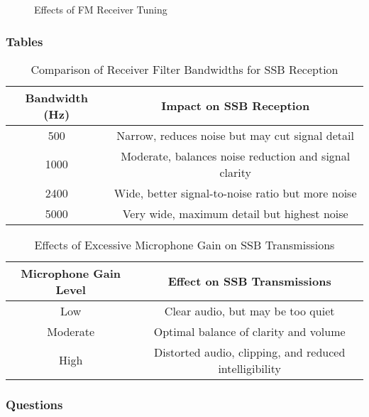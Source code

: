 \begin{figure}[h]
    \centering
    \caption{Effects of FM Receiver Tuning}
    \label{fig:fm-tuning}
\end{figure}

\subsubsection*{Tables}

\begin{table}[h]
    \centering
    \caption{Comparison of Receiver Filter Bandwidths for SSB Reception}
    \label{tab:filter-bandwidth-comparison}
    \begin{tabular}{|c|c|}
        \hline
        \textbf{Bandwidth (Hz)} & \textbf{Impact on SSB Reception} \\
        \hline
        500 & Narrow, reduces noise but may cut signal detail \\
        1000 & Moderate, balances noise reduction and signal clarity \\
        2400 & Wide, better signal-to-noise ratio but more noise \\
        5000 & Very wide, maximum detail but highest noise \\
        \hline
    \end{tabular}
\end{table}

\begin{table}[h]
    \centering
    \caption{Effects of Excessive Microphone Gain on SSB Transmissions}
    \label{tab:mic-gain-effects}
    \begin{tabular}{|c|c|}
        \hline
        \textbf{Microphone Gain Level} & \textbf{Effect on SSB Transmissions} \\
        \hline
        Low & Clear audio, but may be too quiet \\
        Moderate & Optimal balance of clarity and volume \\
        High & Distorted audio, clipping, and reduced intelligibility \\
        \hline
    \end{tabular}
\end{table}

\subsubsection*{Questions}

